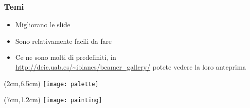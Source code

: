 \begin{frame}
 
 \frametitle{Temi}
 
 \begin{itemize}
  \item Migliorano le slide
  \item Sono relativamente facili da fare
  \item Ce ne sono molti di predefiniti, in 
\url{http://deic.uab.es/~iblanes/beamer_gallery/} potete vedere la loro 
anteprima
 \end{itemize}
 
 \begin{textblock*}{5cm}(2cm,6.5cm)
    \texttt{[image: palette]}
 \end{textblock*}

 
 \begin{textblock*}{5cm}(7cm,1.2cm)
    \texttt{[image: painting]}
 \end{textblock*}

\end{frame}

